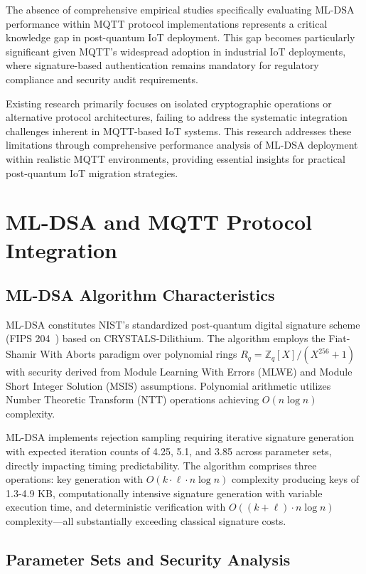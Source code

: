 \documentclass[journal=tches,final]{iacrtrans}
\begin{document}
The absence of comprehensive empirical studies specifically evaluating ML-DSA performance within MQTT protocol implementations represents a critical knowledge gap in post-quantum IoT deployment. This gap becomes particularly significant given MQTT's widespread adoption in industrial IoT deployments, where signature-based authentication remains mandatory for regulatory compliance and security audit requirements.

Existing research primarily focuses on isolated cryptographic operations or alternative protocol architectures, failing to address the systematic integration challenges inherent in MQTT-based IoT systems. This research addresses these limitations through comprehensive performance analysis of ML-DSA deployment within realistic MQTT environments, providing essential insights for practical post-quantum IoT migration strategies.


{\color{blue}\section{ML-DSA and MQTT Protocol Integration}\label{sec:mldsa}

\subsection{ML-DSA Algorithm Characteristics}

ML-DSA constitutes NIST's standardized post-quantum digital signature scheme (FIPS 204~\cite{NIST-FIPS-204}) based on CRYSTALS-Dilithium. The algorithm employs the Fiat-Shamir With Aborts paradigm over polynomial rings $R_q = \mathbb{Z}_q[X]/(X^{256} + 1)$ with security derived from Module Learning With Errors (MLWE) and Module Short Integer Solution (MSIS) assumptions. Polynomial arithmetic utilizes Number Theoretic Transform (NTT) operations achieving $O(n \log n)$ complexity.

ML-DSA implements rejection sampling requiring iterative signature generation with expected iteration counts of 4.25, 5.1, and 3.85 across parameter sets, directly impacting timing predictability. The algorithm comprises three operations: key generation with $O(k \cdot \ell \cdot n \log n)$ complexity producing keys of 1.3-4.9 KB, computationally intensive signature generation with variable execution time, and deterministic verification with $O((k + \ell) \cdot n \log n)$ complexity—all substantially exceeding classical signature costs.}

\subsection{Parameter Sets and Security Analysis}
\end{document}
